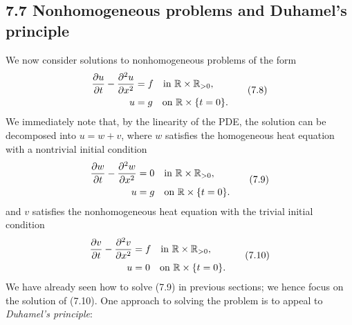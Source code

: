 \subsection{7.7 Nonhomogeneous problems and Duhamel's principle}
We now consider solutions to nonhomogeneous problems of the form
\begin{equation*}
    \begin{aligned}
        \frac{\partial u}{\partial t} - \frac{\partial^2 u}{\partial x^2} &= f \quad \text{in } \mathbb{R} \times \mathbb{R}_{>0}, \\
        u &= g \quad \text{on } \mathbb{R} \times \{t = 0\}.
    \end{aligned} \tag{7.8}
\end{equation*}
We immediately note that, by the linearity of the PDE, the solution can be decomposed into $u = w + v$, where $w$ satisfies the homogeneous heat equation with a nontrivial initial condition
\begin{equation*}
    \begin{aligned}
        \frac{\partial w}{\partial t} - \frac{\partial^2 w}{\partial x^2} &= 0 \quad \text{in } \mathbb{R} \times \mathbb{R}_{>0}, \\
        u &= g \quad \text{on } \mathbb{R} \times \{t = 0\}.
    \end{aligned} \tag{7.9}
\end{equation*}
and $v$ satisfies the nonhomogeneous heat equation with the trivial initial condition
\begin{equation*}
    \begin{aligned}
        \frac{\partial v}{\partial t} - \frac{\partial^2 v}{\partial x^2} &= f \quad \text{in } \mathbb{R} \times \mathbb{R}_{>0}, \\
        u &= 0 \quad \text{on } \mathbb{R} \times \{t = 0\}.
    \end{aligned} \tag{7.10}
\end{equation*}
We have already seen how to solve (7.9) in previous sections; we hence focus on the solution of (7.10). One approach to solving the problem is to appeal to \textit{Duhamel's principle}:

